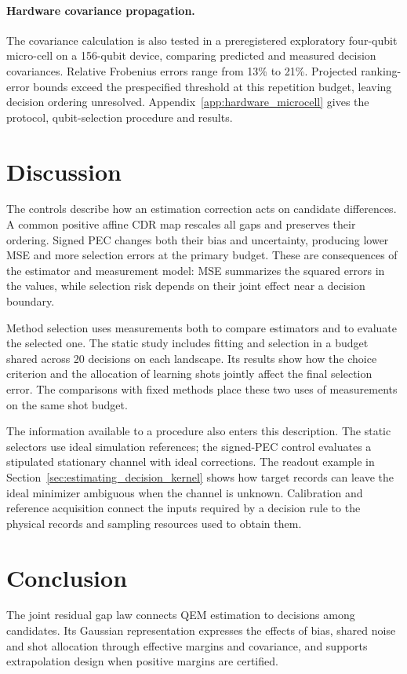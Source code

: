 \documentclass[a4paper,onecolumn,unpublished,nopdfoutputerror]{quantumarticle}
\theoremstyle{plain}
\theoremstyle{definition}
\newcommand{\1}{\mathbf{1}}
\begin{document}
\paragraph{Hardware covariance propagation.}
The covariance calculation is also tested in a preregistered exploratory four-qubit micro-cell on a 156-qubit device, comparing predicted and measured decision covariances. Relative Frobenius errors range from 13\% to 21\%. Projected ranking-error bounds exceed the prespecified threshold at this repetition budget, leaving decision ordering unresolved. Appendix~\ref{app:hardware_microcell} gives the protocol, qubit-selection procedure and results.


\section{Discussion}

The controls describe how an estimation correction acts on candidate differences. A common positive affine CDR map rescales all gaps and preserves their ordering. Signed PEC changes both their bias and uncertainty, producing lower MSE and more selection errors at the primary budget. These are consequences of the estimator and measurement model: MSE summarizes the squared errors in the values, while selection risk depends on their joint effect near a decision boundary.

Method selection uses measurements both to compare estimators and to evaluate the selected one. The static study includes fitting and selection in a budget shared across 20 decisions on each landscape. Its results show how the choice criterion and the allocation of learning shots jointly affect the final selection error. The comparisons with fixed methods place these two uses of measurements on the same shot budget.

The information available to a procedure also enters this description. The static selectors use ideal simulation references; the signed-PEC control evaluates a stipulated stationary channel with ideal corrections. The readout example in Section~\ref{sec:estimating_decision_kernel} shows how target records can leave the ideal minimizer ambiguous when the channel is unknown. Calibration and reference acquisition connect the inputs required by a decision rule to the physical records and sampling resources used to obtain them.

\section{Conclusion}
The joint residual gap law connects QEM estimation to decisions among candidates. Its Gaussian representation expresses the effects of bias, shared noise and shot allocation through effective margins and covariance, and supports extrapolation design when positive margins are certified.
\end{document}

